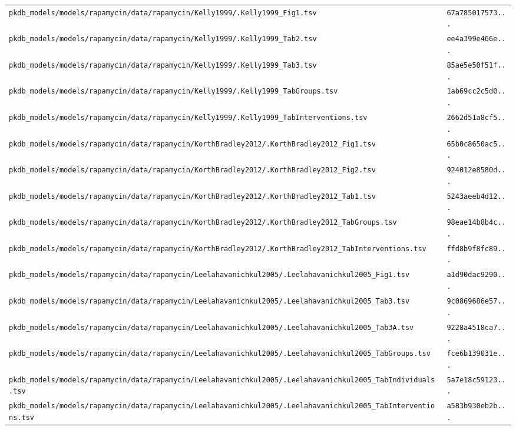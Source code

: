 \begin{longtable}{ll}
\texttt{pkdb\_models/models/rapamycin/data/rapamycin/Kelly1999/.Kelly1999\_Fig1.tsv} & \texttt{67a785017573...} \\
\texttt{pkdb\_models/models/rapamycin/data/rapamycin/Kelly1999/.Kelly1999\_Tab2.tsv} & \texttt{ee4a399e466e...} \\
\texttt{pkdb\_models/models/rapamycin/data/rapamycin/Kelly1999/.Kelly1999\_Tab3.tsv} & \texttt{85ae5e50f51f...} \\
\texttt{pkdb\_models/models/rapamycin/data/rapamycin/Kelly1999/.Kelly1999\_TabGroups.tsv} & \texttt{1ab69cc2c5d0...} \\
\texttt{pkdb\_models/models/rapamycin/data/rapamycin/Kelly1999/.Kelly1999\_TabInterventions.tsv} & \texttt{2662d51a8cf5...} \\
\texttt{pkdb\_models/models/rapamycin/data/rapamycin/KorthBradley2012/.KorthBradley2012\_Fig1.tsv} & \texttt{65b0c8650ac5...} \\
\texttt{pkdb\_models/models/rapamycin/data/rapamycin/KorthBradley2012/.KorthBradley2012\_Fig2.tsv} & \texttt{924012e8580d...} \\
\texttt{pkdb\_models/models/rapamycin/data/rapamycin/KorthBradley2012/.KorthBradley2012\_Tab1.tsv} & \texttt{5243aeeb4d12...} \\
\texttt{pkdb\_models/models/rapamycin/data/rapamycin/KorthBradley2012/.KorthBradley2012\_TabGroups.tsv} & \texttt{98eae14b8b4c...} \\
\texttt{pkdb\_models/models/rapamycin/data/rapamycin/KorthBradley2012/.KorthBradley2012\_TabInterventions.tsv} & \texttt{ffd8b9f8fc89...} \\
\texttt{pkdb\_models/models/rapamycin/data/rapamycin/Leelahavanichkul2005/.Leelahavanichkul2005\_Fig1.tsv} & \texttt{a1d90dac9290...} \\
\texttt{pkdb\_models/models/rapamycin/data/rapamycin/Leelahavanichkul2005/.Leelahavanichkul2005\_Tab3.tsv} & \texttt{9c0869686e57...} \\
\texttt{pkdb\_models/models/rapamycin/data/rapamycin/Leelahavanichkul2005/.Leelahavanichkul2005\_Tab3A.tsv} & \texttt{9228a4518ca7...} \\
\texttt{pkdb\_models/models/rapamycin/data/rapamycin/Leelahavanichkul2005/.Leelahavanichkul2005\_TabGroups.tsv} & \texttt{fce6b139031e...} \\
\texttt{pkdb\_models/models/rapamycin/data/rapamycin/Leelahavanichkul2005/.Leelahavanichkul2005\_TabIndividuals.tsv} & \texttt{5a7e18c59123...} \\
\texttt{pkdb\_models/models/rapamycin/data/rapamycin/Leelahavanichkul2005/.Leelahavanichkul2005\_TabInterventions.tsv} & \texttt{a583b930eb2b...} \\

\end{longtable}

